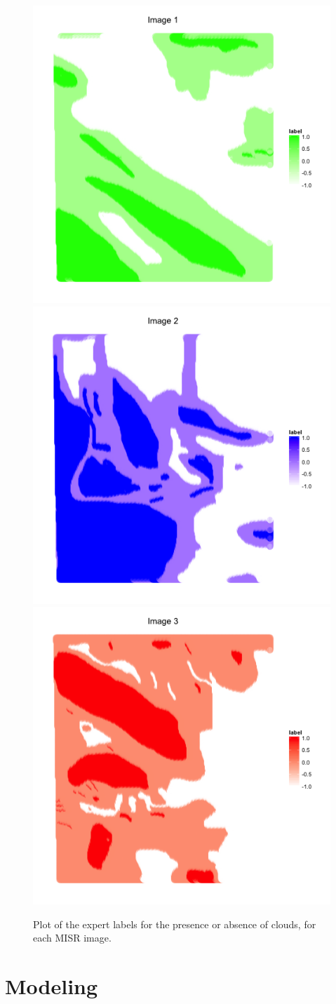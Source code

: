 \documentclass[11pt]{article}\usepackage[]{graphicx}\usepackage[]{color}
\newenvironment{knitrout}{}{} %
\begin{document}
\begin{knitrout}
\color{fgcolor}\begin{figure}[]

\includegraphics[width=0.49\linewidth]{figure/map-plot-1} 
\includegraphics[width=0.49\linewidth]{figure/map-plot-2} 
\includegraphics[width=0.49\linewidth]{figure/map-plot-3} \caption[Plot of the expert labels for the presence or absence of clouds, for each MISR image]{Plot of the expert labels for the presence or absence of clouds, for each MISR image.\label{fig:map-plot}}
\end{figure}


\end{knitrout}
\section{Modeling}
\end{document}
